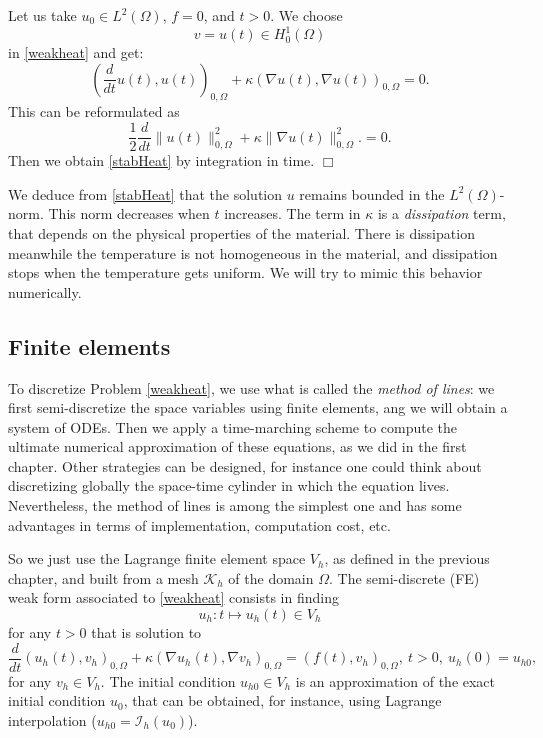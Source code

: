\documentclass{article}
\begin{document}
 Let us take $u_0 \in L^2(\Omega)$, $f=0$, and $t>0$. We choose 
\[
v = u(t) \in H^1_0(\Omega)
\]
in \eqref{weakheat} and get:
\[
\left ( \frac{d}{dt} u(t), u(t) \right )_{0,\Omega} 
    + \kappa \left (\nabla u(t), \nabla u(t) \right)_{0,\Omega} = 0.
\]
This can be reformulated as
\[
\frac12 \frac{d}{dt} \| u(t) \|^2_{0,\Omega}
+ \kappa \| \nabla u(t) \|^2_{0,\Omega}.= 0.
\]
Then we obtain \eqref{stabHeat} by integration in time. $\Box$

\medskip

We deduce from \eqref{stabHeat} that the solution $u$ remains bounded in the $L^2(\Omega)$-norm. This norm decreases when $t$ increases. The term in $\kappa$ is a \emph{dissipation} term, that depends on the physical properties of the material. There is dissipation meanwhile the temperature is not homogeneous in the material, and dissipation stops when the temperature gets uniform. We will try to mimic this behavior numerically.


\subsection{Finite elements}

To discretize Problem \eqref{weakheat}, we use what is called the \emph{method of lines}: we first semi-discretize the space variables using finite elements, ang we will obtain a system of ODEs. Then we apply a time-marching scheme to compute the ultimate numerical approximation of these equations, as we did in the first chapter. Other strategies can be designed, for instance one could think about discretizing globally the space-time cylinder in which the equation lives. Nevertheless, the method of lines is among the simplest one and has some advantages in terms of implementation, computation cost, etc.

So we just use the Lagrange finite element space $V_h$, as defined in the previous chapter, and built from a mesh $\mathcal{K}_h$ of the domain $\Omega$. The semi-discrete (FE) weak form associated to \eqref{weakheat} consists in finding
\[
u_h : t \mapsto u_h(t) \in V_h
\]
for any $t>0$ that is solution to
\begin{equation}
    \label{weakhheat}
    \frac{d}{dt} (u_h(t),v_h)_{0,\Omega} 
    + \kappa (\nabla u_h(t), \nabla v_h)_{0,\Omega} = (f(t),v_h)_{0,\Omega}, \ t>0, \  u_h(0) = u_{h0},
\end{equation}
for any $v_h \in V_h$. The initial condition $u_{h0} \in V_h$ is an approximation of the exact initial condition $u_0$, that can be obtained, for instance, using Lagrange interpolation ($u_{h0} = \mathcal{I}_h (u_0)$).
\end{document}

